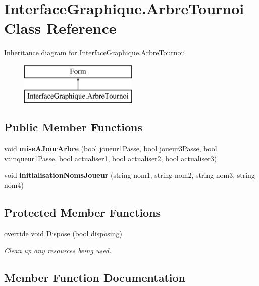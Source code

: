 \hypertarget{class_interface_graphique_1_1_arbre_tournoi}{}\section{Interface\+Graphique.\+Arbre\+Tournoi Class Reference}
\label{class_interface_graphique_1_1_arbre_tournoi}
Inheritance diagram for Interface\+Graphique.\+Arbre\+Tournoi\+:\begin{figure}[H]
\begin{center}
\leavevmode
\includegraphics[height=2.000000cm]{class_interface_graphique_1_1_arbre_tournoi}
\end{center}
\end{figure}
\subsection*{Public Member Functions}
\begin{DoxyCompactItemize}
\item 
void {\bfseries mise\+A\+Jour\+Arbre} (bool joueur1\+Passe, bool joueur3\+Passe, bool vainqueur1\+Passe, bool actualiser1, bool actualiser2, bool actualiser3)
\item 
void {\bfseries initialisation\+Noms\+Joueur} (string nom1, string nom2, string nom3, string nom4)
\end{DoxyCompactItemize}
\subsection*{Protected Member Functions}
\begin{DoxyCompactItemize}
\item 
override void \hyperlink{class_interface_graphique_1_1_arbre_tournoi_a02a9179ff4e8e7226530694ed9078e66}{Dispose} (bool disposing)
\begin{DoxyCompactList}\small\item\em Clean up any resources being used. \end{DoxyCompactList}\end{DoxyCompactItemize}


\subsection{Member Function Documentation}
\hypertarget{class_interface_graphique_1_1_arbre_tournoi_a02a9179ff4e8e7226530694ed9078e66}{}\label{class_interface_graphique_1_1_arbre_tournoi_a02a9179ff4e8e7226530694ed9078e66} 
